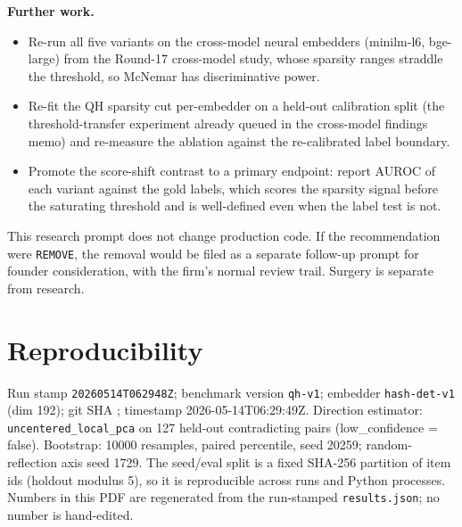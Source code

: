\documentclass[11pt]{article}
\begin{document}
\noindent\textbf{Further work.}
\begin{itemize}
\item Re-run all five variants on the cross-model neural embedders (minilm-l6, bge-large) from the Round-17 cross-model study, whose sparsity ranges straddle the threshold, so McNemar has discriminative power.
\item Re-fit the QH sparsity cut per-embedder on a held-out calibration split (the threshold-transfer experiment already queued in the cross-model findings memo) and re-measure the ablation against the re-calibrated label boundary.
\item Promote the score-shift contrast to a primary endpoint: report AUROC of each variant against the gold labels, which scores the sparsity signal before the saturating threshold and is well-defined even when the label test is not.
\end{itemize}

\noindent This research prompt does not change production code. If the recommendation were \texttt{REMOVE}, the removal would be filed as a separate follow-up prompt for founder consideration, with the firm's normal review trail. Surgery is separate from research.

\section{Reproducibility}
Run stamp \texttt{20260514T062948Z}; benchmark version \texttt{qh-v1}; embedder \texttt{hash-det-v1} (dim 192); git SHA \texttt{}; timestamp 2026-05-14T06:29:49Z. Direction estimator: \texttt{uncentered\_local\_pca} on 127 held-out contradicting pairs (low\_confidence = false). Bootstrap: 10000 resamples, paired percentile, seed 20259; random-reflection axis seed 1729. The seed/eval split is a fixed SHA-256 partition of item ids (holdout modulus 5), so it is reproducible across runs and Python processes. Numbers in this PDF are regenerated from the run-stamped \texttt{results.json}; no number is hand-edited.
\end{document}
